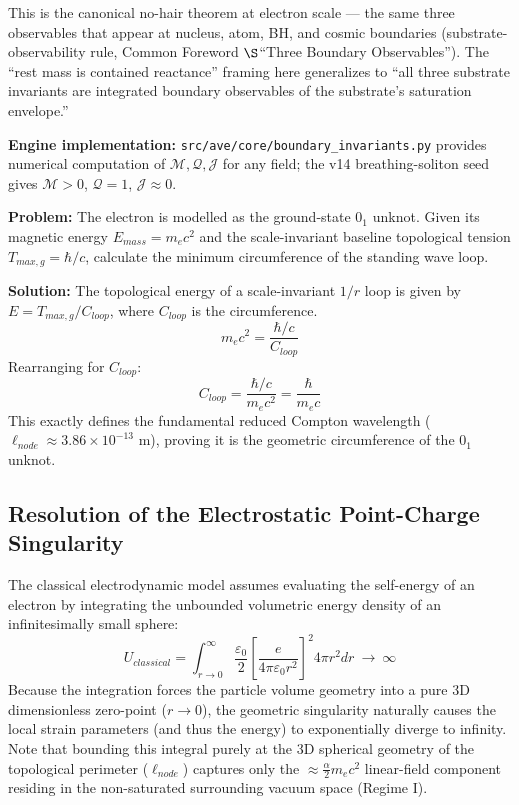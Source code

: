 This is the canonical no-hair theorem at electron scale --- the same three
observables that appear at nucleus, atom, BH, and cosmic boundaries
(substrate-observability rule, Common Foreword $\S$``Three Boundary
Observables''). The ``rest mass is contained reactance'' framing here
generalizes to ``all three substrate invariants are integrated boundary
observables of the substrate's saturation envelope.''

\textbf{Engine implementation:}
\texttt{src/ave/core/boundary\_invariants.py} provides numerical computation
of $\mathcal{M}, \mathcal{Q}, \mathcal{J}$ for any field; the v14
breathing-soliton seed gives $\mathcal{M} > 0$, $\mathcal{Q} = 1$,
$\mathcal{J} \approx 0$.

\begin{examplebox}
\textbf{Problem:} The electron is modelled as the ground-state $0_1$ unknot. Given its magnetic energy $E_{mass} = m_e c^2$ and the scale-invariant baseline topological tension $T_{max,g} = \hbar/c$, calculate the minimum circumference of the standing wave loop.

\textbf{Solution:} The topological energy of a scale-invariant $1/r$ loop is given by $E = T_{max,g} / C_{loop}$, where $C_{loop}$ is the circumference.
\[ m_e c^2 = \frac{\hbar/c}{C_{loop}} \]
Rearranging for $C_{loop}$:
\[ C_{loop} = \frac{\hbar/c}{m_e c^2} = \frac{\hbar}{m_e c} \]
This exactly defines the fundamental reduced Compton wavelength ($\ell_{node} \approx 3.86 \times 10^{-13}$ m), proving it is the geometric circumference of the $0_1$ unknot.
\end{examplebox}

\subsection{Resolution of the Electrostatic Point-Charge Singularity}
The classical electrodynamic model assumes evaluating the self-energy of an electron by integrating the unbounded volumetric energy density of an infinitesimally small sphere:
\begin{equation}
   U_{classical} = \int_{r \to 0}^\infty \frac{\varepsilon_0}{2} \left[ \frac{e}{4\pi\varepsilon_0 r^2} \right]^2 4\pi r^2 dr \ \longrightarrow \ \infty
\end{equation}
Because the integration forces the particle volume geometry into a pure 3D dimensionless zero-point ($r \to 0$), the geometric singularity naturally causes the local strain parameters (and thus the energy) to exponentially diverge to infinity. Note that bounding this integral purely at the 3D spherical geometry of the topological perimeter ($\ell_{node}$) captures only the $\approx \frac{\alpha}{2} m_e c^2$ linear-field component residing in the non-saturated surrounding vacuum space (Regime I).


